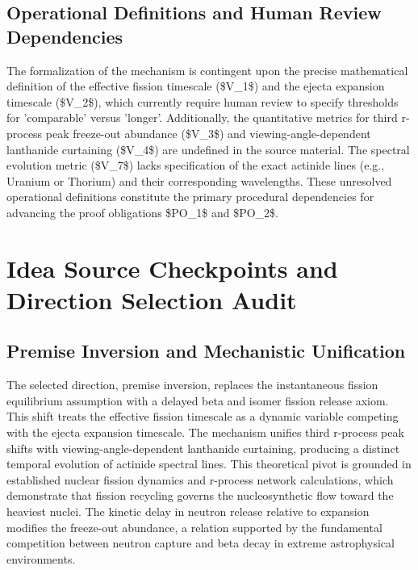 \documentclass[conference]{IEEEtran}
\begin{document}
\subsection{Operational Definitions and Human Review Dependencies}
The formalization of the mechanism is contingent upon the precise mathematical definition of the effective fission timescale (\$V\_1\$) and the ejecta expansion timescale (\$V\_2\$), which currently require human review to specify thresholds for 'comparable' versus 'longer'. Additionally, the quantitative metrics for third r-process peak freeze-out abundance (\$V\_3\$) and viewing-angle-dependent lanthanide curtaining (\$V\_4\$) are undefined in the source material. The spectral evolution metric (\$V\_7\$) lacks specification of the exact actinide lines (e.g., Uranium or Thorium) and their corresponding wavelengths. These unresolved operational definitions constitute the primary procedural dependencies for advancing the proof obligations \$PO\_1\$ and \$PO\_2\$.

\section{Idea Source Checkpoints and Direction Selection Audit}
\subsection{Premise Inversion and Mechanistic Unification}
The selected direction, premise inversion, replaces the instantaneous fission equilibrium assumption with a delayed beta and isomer fission release axiom. This shift treats the effective fission timescale as a dynamic variable competing with the ejecta expansion timescale. The mechanism unifies third r-process peak shifts with viewing-angle-dependent lanthanide curtaining, producing a distinct temporal evolution of actinide spectral lines. This theoretical pivot is grounded in established nuclear fission dynamics and r-process network calculations, which demonstrate that fission recycling governs the nucleosynthetic flow toward the heaviest nuclei. The kinetic delay in neutron release relative to expansion modifies the freeze-out abundance, a relation supported by the fundamental competition between neutron capture and beta decay in extreme astrophysical environments.~\cite{cite_30c88fe46f23448d,cite_b668987a568d271f,cite_fc6f024383b8a4d2}
\end{document}
